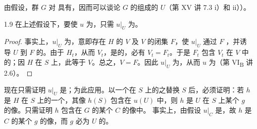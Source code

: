 由假设，群 $G$ 对 具有，因而可以谈论 $G$ 的组成的 $U$（第 XV 讲 7.3 i）和 ii））。
\begin{SGAresult}{}{1.9}
在上述假设下，要使 $u$ 为，只需 $u|_U$ 为。
\end{SGAresult}
\begin{proof}
事实上，$u|_U$ 为，意即存在 $H$ 的 $V$ 及 $V$ 的闭集 $F$，使 $u|_U$ 通过 $F$ ，并诱导 $U$ 到 $F$ 的。由于 $H_t$，从而 $V_t$，是的，必有 $V_t=F_t$。于是 $F_t$ 包含 $V_t$ 在 $V$ 中的；因 $H$ 在 $S$ 上，此等于 $V$。总之，$V=F$。因此 $u|_U$ 为，从而 $u$ 为（第 VI\textsubscript{B} 讲 2.6）。
\end{proof}
现在只需证明 $u|_U$ 是；为此应用。以一个在 $S$ 上的之替换 $S$ 后，必须证明：若 $h$ 是 $H$ 在 $S$ 上的一个，其像 $h(S)$ 包含在 $u(U)$ 中，则 $h$ 是 $U$ 在 $S$ 上某个 $g$ 的像。只需证明 $h$ 包含在 $G$ 的某个 $C$ 的像中。
事实上，由假设 $u|_C$ 是，故 $h$ 是 $C$ 的某个 $g$ 的像，而 $g$ 必为 $U$ 的。

